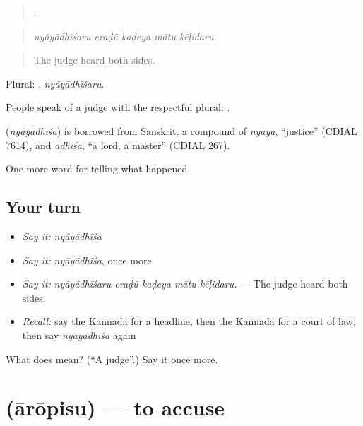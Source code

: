 \begin{quote}
    .
\end{quote}

\begin{quote}
\emph{nyāyādhīśaru eraḍū kaḍeya mātu kēḷidaru.}
\end{quote}

\begin{quote}
The judge heard both sides.
\end{quote}

Plural: , \emph{nyāyādhīśaru}.

People speak of a judge with the respectful plural:  .

\begin{cousinweb}
\textbf{} (\emph{nyāyādhīśa}) is borrowed from Sanskrit, a compound of \emph{nyāya}, \textquotedblleft{}justice\textquotedblright{} (CDIAL 7614), and \emph{adhīśa}, \textquotedblleft{}a lord, a master\textquotedblright{} (CDIAL 267).
\end{cousinweb}

\begin{grammarlens}[title={What you've built}]
One more word for telling what happened.
\end{grammarlens}

\subsection*{Your turn}
\begin{itemize}
\raggedright
  \item \emph{Say it:} \emph{nyāyādhīśa}
  \item \emph{Say it:} \emph{nyāyādhīśa}, once more
  \item \emph{Say it:} \emph{nyāyādhīśaru eraḍū kaḍeya mātu kēḷidaru.} — The judge heard both sides.
  \item \emph{Recall:} say the Kannada for a headline, then the Kannada for a court of law, then say \emph{nyāyādhīśa} again
\end{itemize}

\begin{tcolorbox}[breakable,colback=teal!4,colframe=teal!35!black,title={Before you move on}]
What does  mean? (\textquotedblleft{}A judge\textquotedblright{}.) Say it once more.
\end{tcolorbox}
\section[\texorpdfstring{\kn{ಆರೋಪಿಸು} (ārōpisu)}{ಆರೋಪಿಸು (ārōpisu)}]{ (ārōpisu) — to accuse}

